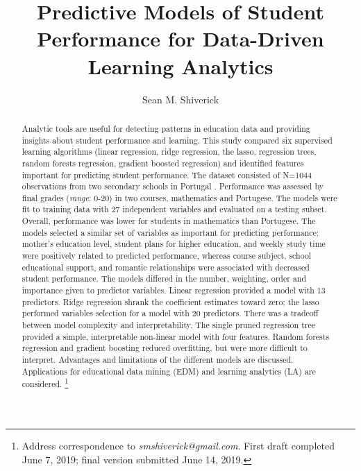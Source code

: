 \documentclass[sigconf]{acmart}
\begin{document}
  \title{Predictive Models of Student Performance for Data-Driven 
  Learning Analytics}
  \author{Sean M. Shiverick}
\renewcommand{\shortauthors}{S.M. Shiverick}


\begin{abstract}

Analytic tools are useful for detecting patterns in education data and 
providing insights about student performance and learning. This study compared 
six supervised learning algorithms (linear regression, ridge regression, the 
lasso, regression trees, random forests regression, gradient boosted regression) 
and identified features important for predicting student performance. The 
dataset consisted of N=1044 observations from two secondary schools in 
Portugal \cite{cortez08}. Performance was assessed by final grades 
(\textit{range}: 0-20) in two courses, mathematics and Portugese. The models 
were fit to training data with 27 independent variables and evaluated on a 
testing subset. Overall, performance was lower for students in mathematics 
than Portugese. The models selected a similar set of variables as important 
for predicting performance: mother's education level, student plans for higher 
education, and weekly study time were positively related to predicted 
performance, whereas course subject, school educational support, and romantic 
relationships were associated with decreased student performance. The models 
differed in the number, weighting, order and importance given to predictor 
variables. Linear regression provided a model with 13 predictors. Ridge 
regression shrank the coefficient estimates toward zero; the lasso performed 
variables selection for a model with 20 predictors. There was a tradeoff 
between model complexity and interpretability. The single pruned regression 
tree provided a simple, interpretable non-linear model with four features. Random 
forests regression and gradient boosting reduced overfitting, but were 
more difficult to interpret. Advantages and limitations of the different models 
are discussed. Applications for educational data mining (EDM) and learning 
analytics (LA) are considered. 
\footnote{Address correspondence to \textit{smshiverick@gmail.com}.
First draft completed June 7, 2019; final version submitted June 14, 2019.}

\end{abstract}
\maketitle
\end{document}
